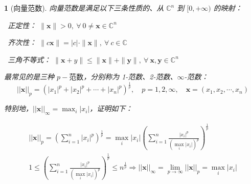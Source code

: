 \documentclass[zihao=5,UTF8]{report}
\def\C{\mathbb{C}}
\theoremstyle{MyTheoremStyle} %
\theoremstyle{MySubsubsectionStyle} %
\newtheorem{definition}{}
\begin{document}
\begin{definition}[向量范数]
向量范数是满足以下三条性质的、从 $\C^n$ 到 $[0, +\infty)$ 的映射：

\par{}\ 正定性： $\| \boldsymbol{x} \| >0,\ \forall\  0 \ne \boldsymbol{x} \in \C^n$   \par
{}\ 齐次性： $\| c\boldsymbol{x} \| = | c |\cdot \| \boldsymbol{x} \|,\ \forall\  c \in \C$   \par
{}\  三角不等式： $\| \boldsymbol{x}+y \| \leqslant  \| \boldsymbol{x} \| + \| \boldsymbol{y} \|,\ \forall\  \boldsymbol{x},\boldsymbol{y} \in \C^n$   \par\noindent

最常见的是三种 $p-\text{范数}$，分别称为 1-范数、2-范数、$\infty$-范数：
\begin{equation}
    ||\boldsymbol{x}||_p=(|x_1|^p+|x_2|^p+\cdots+|x_n|^p)^{\frac{1}{p}},\quad p=1,2,\infty,\quad \boldsymbol{x} = (x_1, x_2, \cdots, x_n)
\end{equation}

特别地，$||\boldsymbol{x}||_{\infty} = \max_i|x_i|$，证明如下：

\begin{gather}
    ||\boldsymbol{x}||_{p}=\left(\sum_{i=1}^{n}|x_{i}|^{p}\right)^{\frac{1}{p}}=\max_{i}|x_{i}|\left(\sum_{i=1}^{n}\frac{|x_{i}|^{p}}{(\max_{i}|x_{i}|)^{p}}\right)^{\frac{1}{p}} \\ 
    1\leqslant\left(\sum_{i=1}^n\frac{|x_i|^p}{(\max_i|x_i|)^p}\right)^{\frac1p}\leqslant n^{\frac1p}
    \Longrightarrow ||\boldsymbol{x}||_{\infty}=\operatorname*{lim}_{p\to\infty}||\boldsymbol{x}||_{p}=\max_{i}|x_{i}|
\end{gather}

\end{definition}
\end{document}
